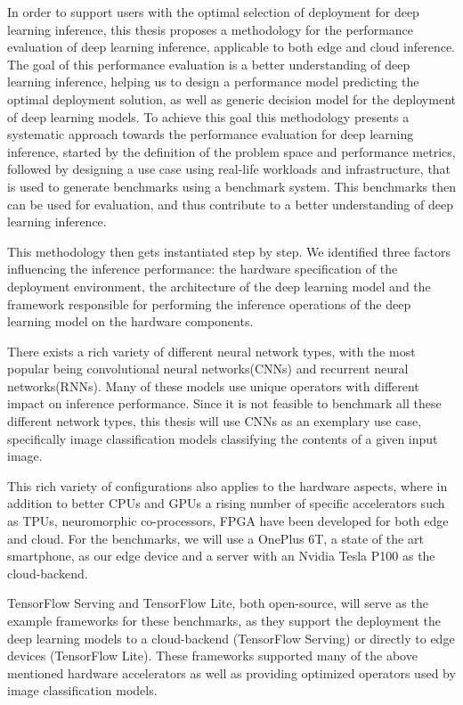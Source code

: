 In order to support users with the optimal selection of deployment for deep learning inference, this thesis proposes a methodology for the performance evaluation of deep learning inference, applicable to both edge and cloud inference.
The goal of this performance evaluation is a better understanding of deep learning inference, helping us to design a performance model predicting the optimal deployment solution, as well as generic decision model for the deployment of deep learning models.
To achieve this goal this methodology presents a systematic approach towards the performance evaluation for deep learning inference, started by the definition of the problem space and performance metrics, followed by designing a use case using real-life workloads and infrastructure, that is used to generate benchmarks using a benchmark system.
This benchmarks then can be used for evaluation, and thus contribute to a better understanding of deep learning inference.

This methodology then gets instantiated step by step.
We identified three factors influencing the inference performance: the hardware specification of the deployment environment, the architecture of the deep learning model and the framework responsible for performing the inference operations of the deep learning model on the hardware components.

There exists a rich variety of different neural network types, with the most popular being convolutional neural networks(CNNs) and recurrent neural networks(RNNs).
Many of these models use unique operators with different impact on inference performance.
Since it is not feasible to benchmark all these different network types, this thesis will use CNNs as an exemplary use case, specifically image classification models classifying the contents of a given input image.

This rich variety of configurations also applies to the hardware aspects, where in addition to better CPUs and GPUs a rising number of specific accelerators such as TPUs, neuromorphic co-processors, FPGA have been developed for both edge and cloud.
For the benchmarks, we will use a OnePlus 6T, a state of the art smartphone, as our edge device and a server with an Nvidia Tesla P100 as the cloud-backend.

TensorFlow Serving and TensorFlow Lite, both open-source, will serve as the example frameworks for these benchmarks, as they support the deployment the deep learning models to a cloud-backend (TensorFlow Serving) or directly to edge devices (TensorFlow Lite). These frameworks supported many of the above mentioned hardware accelerators as well as providing optimized operators used by image classification models.

